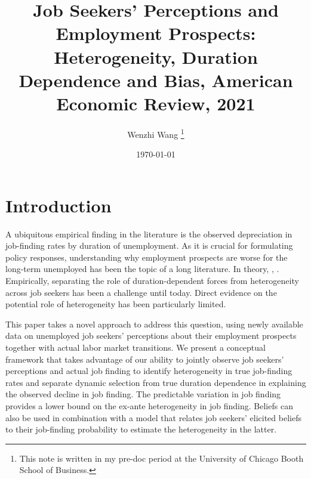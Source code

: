 \documentclass[12pt]{article}
\newcommand{\highlightP}[1]{{\emph{\color{MyPink}{#1}}}}
\theoremstyle{definition}
\begin{document}
 


\title{\bf Job Seekers' Perceptions and Employment Prospects:  Heterogeneity, Duration Dependence and Bias, American Economic Review, 2021} 
\author{Wenzhi Wang \thanks{This note is written in my pre-doc period at the University of Chicago Booth School of Business.} } 
\date{\today} 
\maketitle 

\citet{muellerJobSeekersPerceptions2021}

\section{Introduction}

A ubiquitous empirical finding in the literature is the observed depreciation in job-finding rates by duration of unemployment. As it is crucial for formulating policy responses, understanding why employment prospects are worse for the long-term unemployed has been the topic of a long literature. In theory, \highlightP{long-term unemployment may reduce a worker's chances to find a job (e.g., due to skill depreciation or duration-based employer screening)}, \highlightP{but less employable workers also select into long-term unemployment}. Empirically, separating the role of duration-dependent forces from heterogeneity across job seekers has been a challenge until today. Direct evidence on the potential role of heterogeneity has been particularly limited. 

This paper takes a novel approach to address this question, using newly available data on unemployed job seekers' perceptions about their employment prospects together with actual labor market transitions. We present a conceptual framework that takes advantage of our ability to jointly observe job seekers' perceptions and actual job finding to identify heterogeneity in true job-finding rates and separate dynamic selection from true duration dependence in explaining the observed decline in job finding. \highlightP{The key idea underlying identification in this framework is that the covariance between perceptions and actual job finding helps uncovering the extent of ex-ante heterogeneity in true job-finding probabilities.} The predictable variation in job finding provides a lower bound on the ex-ante heterogeneity in job finding. Beliefs can also be used in combination with a model that relates job seekers' elicited beliefs to their job-finding probability to estimate the heterogeneity in the latter. 
\end{document}
